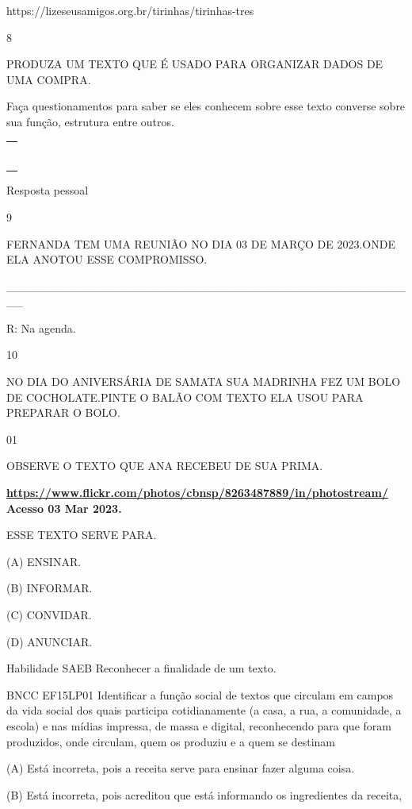 {{https://lizeseusamigos.org.br/tirinhas/tirinhas-tres

\num{8}

PRODUZA UM TEXTO QUE É USADO PARA ORGANIZAR DADOS DE UMA COMPRA.

Faça questionamentos para saber se eles conhecem sobre esse texto
converse sobre sua função, estrutura entre outros.

\begin{longtable}[]{@{}l@{}}
\toprule
\tabularnewline
\tabularnewline
\tabularnewline
\tabularnewline
\tabularnewline
\tabularnewline
\tabularnewline
\bottomrule
\end{longtable}

Resposta pessoal

\num{9}

FERNANDA TEM UMA REUNIÃO NO DIA 03 DE MARÇO DE 2023.ONDE ELA ANOTOU ESSE
COMPROMISSO.

\_\_\_\_\_\_\_\_\_\_\_\_\_\_\_\_\_\_\_\_\_\_\_\_\_\_\_\_\_\_\_\_\_\_\_\_\_\_\_\_\_\_\_\_\_\_\_\_\_\_

R: Na agenda.

\num{10}

NO DIA DO ANIVERSÁRIA DE SAMATA SUA MADRINHA FEZ UM BOLO DE
COCHOLATE.PINTE O BALÃO COM TEXTO ELA USOU PARA PREPARAR O BOLO.


\num{01}

OBSERVE O TEXTO QUE ANA RECEBEU DE SUA PRIMA.

\textbf{\url{https://www.flickr.com/photos/cbnsp/8263487889/in/photostream/}
Acesso 03 Mar 2023.}

ESSE TEXTO SERVE PARA.

(A) ENSINAR.

(B) INFORMAR.

(C) CONVIDAR.

(D) ANUNCIAR.

Habilidade SAEB Reconhecer a finalidade de um texto.

BNCC EF15LP01 Identificar a função social de textos que circulam em
campos da vida social dos quais participa cotidianamente (a casa, a rua,
a comunidade, a escola) e nas mídias impressa, de massa e digital,
reconhecendo para que foram produzidos, onde circulam, quem os produziu
e a quem se destinam

(A) Está incorreta, pois a receita serve para ensinar fazer alguma
coisa.

(B) Está incorreta, pois acreditou que está informando os ingredientes
da receita,

}}
